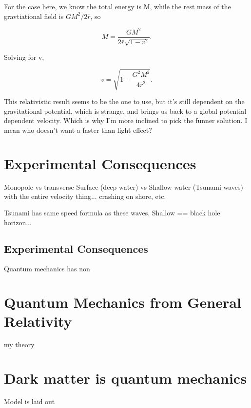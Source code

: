 \documentclass[../rzero]{subfiles}
\begin{document}
For the case here, we know the total energy is M, while the rest mass of the gravtiational field is $GM^2/2 \bar r $, so

\begin{equation}
 M = \frac{GM^2}{2 \bar r \sqrt{1 - v^2}}.
\end{equation}

Solving for v, 

\begin{equation}
 v = \sqrt{1 - \frac{G^2M^2}{4\bar r^2}}.
\end{equation}



This relativistic result seems to be the one to use, but it's still dependent on the gravitational potential, which is strange, and brings us back to a global potential dependent velocity. Which is why I'm more inclined to pick the funner solution. I mean who doesn't want a faster than light effect? 


\section{Experimental Consequences}
Monopole vs transverse Surface (deep water) vs Shallow water (Tsunami waves) with the entire velocity thing... crashing on shore, etc. 

Tsunami has same speed formula as these waves. Shallow == black hole horizon...

\subsection{Experimental Consequences}



Quantum mechanics has non



\section{Quantum Mechanics from General Relativity}
my theory


\section{Dark matter is quantum mechanics}
	Model is laid out 
\end{document}

